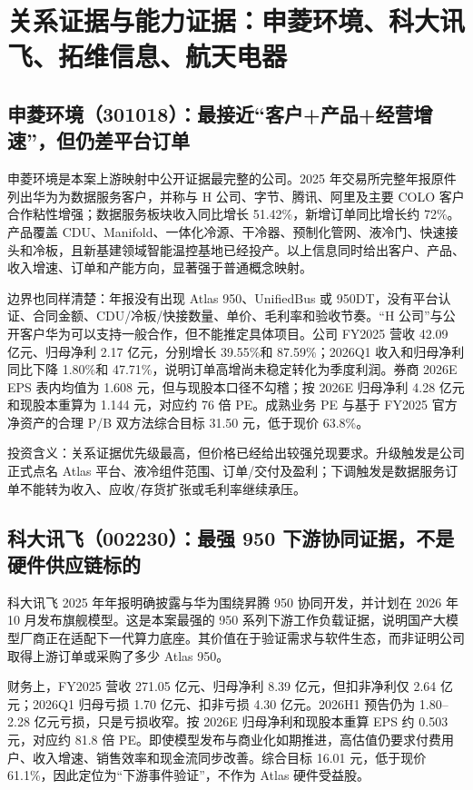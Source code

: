 \section{关系证据与能力证据：申菱环境、科大讯飞、拓维信息、航天电器}

\subsection{申菱环境（301018）：最接近“客户+产品+经营增速”，但仍差平台订单}

申菱环境是本案上游映射中公开证据最完整的公司。2025 年交易所完整年报原件列出华为为数据服务客户，并称与 H 公司、字节、腾讯、阿里及主要 COLO 客户合作粘性增强；数据服务板块收入同比增长 51.42\%，新增订单同比增长约 72\%。产品覆盖 CDU、Manifold、一体化冷源、干冷器、预制化管网、液冷门、快速接头和冷板，且新基建领域智能温控基地已经投产。以上信息同时给出客户、产品、收入增速、订单和产能方向，显著强于普通概念映射。

边界也同样清楚：年报没有出现 Atlas 950、UnifiedBus 或 950DT，没有平台认证、合同金额、CDU/冷板/快接数量、单价、毛利率和验收节奏。“H 公司”与公开客户华为可以支持一般合作，但不能推定具体项目。公司 FY2025 营收 42.09 亿元、归母净利 2.17 亿元，分别增长 39.55\%和 87.59\%；2026Q1 收入和归母净利同比下降 1.80\%和 47.71\%，说明订单高增尚未稳定转化为季度利润。券商 2026E EPS 表内均值为 1.608 元，但与现股本口径不勾稽；按 2026E 归母净利 4.28 亿元和现股本重算为 1.144 元，对应约 76 倍 PE。成熟业务 PE 与基于 FY2025 官方净资产的合理 P/B 双方法综合目标 31.50 元，低于现价 63.8\%。

投资含义：关系证据优先级最高，但价格已经给出较强兑现要求。升级触发是公司正式点名 Atlas 平台、液冷组件范围、订单/交付及盈利；下调触发是数据服务订单不能转为收入、应收/存货扩张或毛利率继续承压。

\subsection{科大讯飞（002230）：最强 950 下游协同证据，不是硬件供应链标的}

科大讯飞 2025 年年报明确披露与华为围绕昇腾 950 协同开发，并计划在 2026 年 10 月发布旗舰模型。这是本案最强的 950 系列下游工作负载证据，说明国产大模型厂商正在适配下一代算力底座。其价值在于验证需求与软件生态，而非证明公司取得上游订单或采购了多少 Atlas 950。

财务上，FY2025 营收 271.05 亿元、归母净利 8.39 亿元，但扣非净利仅 2.64 亿元；2026Q1 归母亏损 1.70 亿元、扣非亏损 4.30 亿元。2026H1 预告仍为 1.80--2.28 亿元亏损，只是亏损收窄。按 2026E 归母净利和现股本重算 EPS 约 0.503 元，对应约 81.8 倍 PE。即使模型发布与商业化如期推进，高估值仍要求付费用户、收入增速、销售效率和现金流同步改善。综合目标 16.01 元，低于现价 61.1\%，因此定位为“下游事件验证”，不作为 Atlas 硬件受益股。

